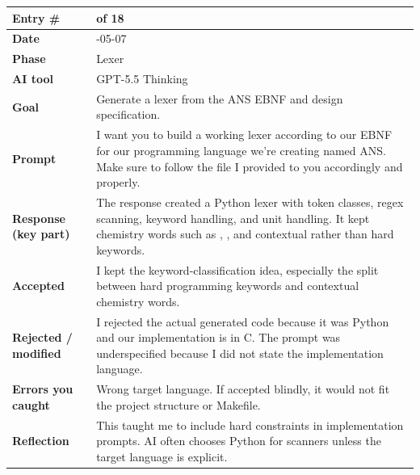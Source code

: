 \documentclass[11pt,a4paper]{article}
\newcommand{\code}[1]{\texttt{\detokenize{#1}}}
\newcommand{\entrygap}{\vspace{8pt}}
\newenvironment{journalentry}{%
  \begin{center}\small\renewcommand{\arraystretch}{1.22}%
  \begin{tabular}{|>{\columncolor{anscodebg}\bfseries}p{3.0cm}|>{\RaggedRight\arraybackslash}p{12.25cm}|}%
  \hline
}{%
  \end{tabular}\end{center}\entrygap
}
\begin{document}
\begin{journalentry}
Entry \# & 9 of 18 \\ \hline
Date & 2026-05-07 \\ \hline
Phase & Lexer \\ \hline
AI tool & GPT-5.5 Thinking \\ \hline
Goal & Generate a lexer from the ANS EBNF and design specification. \\ \hline
Prompt & I want you to build a working lexer according to our EBNF for our programming language we're creating named ANS. Make sure to follow the file I provided to you accordingly and properly. \\ \hline
Response (key part) & The response created a Python lexer with token classes, regex scanning, keyword handling, and unit handling. It kept chemistry words such as \code{element}, \code{compound}, and \code{reaction} contextual rather than hard keywords. \\ \hline
Accepted & I kept the keyword-classification idea, especially the split between hard programming keywords and contextual chemistry words. \\ \hline
Rejected / modified & I rejected the actual generated code because it was Python and our implementation is in C. The prompt was underspecified because I did not state the implementation language. \\ \hline
Errors you caught & Wrong target language. If accepted blindly, it would not fit the project structure or Makefile. \\ \hline
Reflection & This taught me to include hard constraints in implementation prompts. AI often chooses Python for scanners unless the target language is explicit. \\ \hline
\end{journalentry}
\end{document}
